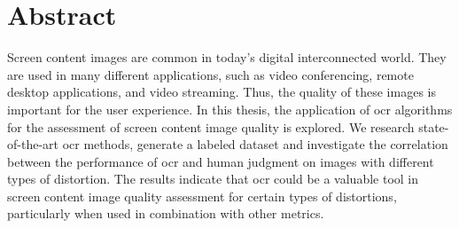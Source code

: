 \chapter{Abstract}

Screen content images are common in today's digital interconnected world.
They are used in many different applications, such as video conferencing, remote desktop applications, and video streaming.
Thus, the quality of these images is important for the user experience.
In this thesis, the application of \gls{ocr} algorithms for the assessment of screen content image quality is explored.
We research state-of-the-art \gls{ocr} methods, generate a labeled dataset and investigate the correlation between the performance of \gls{ocr} and human judgment on images with different types of distortion.
The results indicate that \gls{ocr} could be a valuable tool in screen content image quality assessment for certain types of distortions, particularly when used in combination with other metrics.
